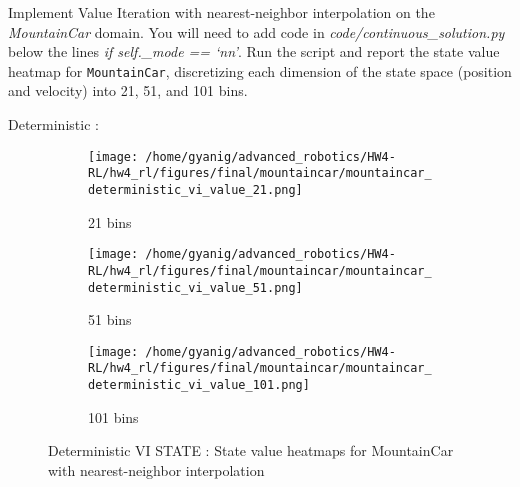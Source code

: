 \documentclass{article}
\begin{document}
Implement Value Iteration with nearest-neighbor interpolation on the \textit{MountainCar} domain. You will need to add code in \textit{code/continuous\_solution.py} below the lines \textit{if self.\_mode == `nn'}. Run the script and report the state value heatmap for \texttt{MountainCar}, discretizing each dimension of the state space (position and velocity) into 21, 51, and 101 bins.

Deterministic :

\begin{figure}[h]
    \centering
    \begin{subfigure}{0.32\textwidth}
        \texttt{[image: /home/gyanig/advanced\_robotics/HW4-RL/hw4\_rl/figures/final/mountaincar/mountaincar\_deterministic\_vi\_value\_21.png]}
        \caption{21 bins}
    \end{subfigure}
    \begin{subfigure}{0.32\textwidth}
        \texttt{[image: /home/gyanig/advanced\_robotics/HW4-RL/hw4\_rl/figures/final/mountaincar/mountaincar\_deterministic\_vi\_value\_51.png]}
        \caption{51 bins}
    \end{subfigure}
    \begin{subfigure}{0.32\textwidth}
        \texttt{[image: /home/gyanig/advanced\_robotics/HW4-RL/hw4\_rl/figures/final/mountaincar/mountaincar\_deterministic\_vi\_value\_101.png]}
        \caption{101 bins}
    \end{subfigure}
    \caption{Deterministic VI STATE : State value heatmaps for MountainCar with nearest-neighbor interpolation}
\end{figure}
\end{document}

